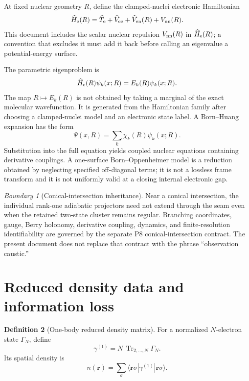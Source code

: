 \documentclass[11pt,a4paper]{article}
\theoremstyle{definition}
\newtheorem{definition}{Definition}[section]
\theoremstyle{plain}
\theoremstyle{remark}
\newtheorem{warning}[definition]{Boundary}
\newcommand{\Tr}{\operatorname{Tr}}
\begin{document}
At fixed nuclear geometry \(R\), define the clamped-nuclei electronic
Hamiltonian
\begin{equation}\label{eq:clamped-hamiltonian}
\widehat H_{\rm e}(R)
=\widehat T_{\rm e}+\widehat V_{\rm ee}
+\widehat V_{\rm en}(R)+V_{\rm nn}(R).
\end{equation}
This document includes the scalar nuclear repulsion
\(V_{\rm nn}(R)\) in \(\widehat H_{\rm e}(R)\); a convention that
excludes it must add it back before calling an eigenvalue a
potential-energy surface.

The parametric eigenproblem is
\begin{equation}\label{eq:electronic-eigenproblem}
\widehat H_{\rm e}(R)\psi_k(x;R)=E_k(R)\psi_k(x;R).
\end{equation}
The map \(R\mapsto E_k(R)\) is not obtained by taking a marginal of the
exact molecular wavefunction.  It is generated from the Hamiltonian
family after choosing a clamped-nuclei model and an electronic state
label.  A Born--Huang expansion has the form
\begin{equation}\label{eq:born-huang}
\Psi(x,R)=\sum_k\chi_k(R)\psi_k(x;R).
\end{equation}
Substitution into the full equation yields coupled nuclear equations
containing derivative couplings.  A one-surface Born--Oppenheimer
model is a reduction obtained by neglecting specified off-diagonal
terms; it is not a lossless frame transform and it is not uniformly
valid at a closing internal electronic gap.

\begin{warning}[Conical-intersection inheritance]
Near a conical intersection, the individual rank-one adiabatic
projectors need not extend through the seam even when the retained
two-state cluster remains regular.  Branching coordinates, gauge,
Berry holonomy, derivative coupling, dynamics, and finite-resolution
identifiability are governed by the separate P8 conical-intersection
contract.  The present document does not replace that contract with
the phrase ``observation caustic.''
\end{warning}

\section{Reduced density data and information loss}

\begin{definition}[One-body reduced density matrix]
For a normalized \(N\)-electron state \(\Gamma_N\), define
\begin{equation}\label{eq:one-rdm}
\gamma^{(1)}
=N\,\Tr_{2,\ldots,N}\Gamma_N .
\end{equation}
Its spatial density is
\begin{equation}\label{eq:density}
n(\bm r)
=\sum_{\sigma}
\langle \bm r\sigma|\gamma^{(1)}|\bm r\sigma\rangle .
\end{equation}
\end{definition}
\end{document}

